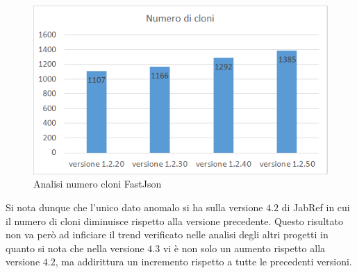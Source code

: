 \begin{figure}[h]
	\centering
	\includegraphics[scale=0.75, trim = 0cm 0cm 0cm 0cm, clip=true]{Grafici_fastJson/NumeroCloni.png}
	\caption{Analisi numero cloni FastJson}
	\label{fig:nCloniFastjson}
\end{figure}
Si nota dunque che l'unico dato anomalo si ha sulla versione $4.2$ di JabRef in cui il numero di cloni diminuisce rispetto alla versione precedente. Questo risultato non va però ad inficiare il trend verificato nelle analisi degli altri progetti in quanto si nota che nella versione $4.3$ vi è non solo un aumento rispetto alla versione $4.2$, ma addirittura un incremento rispetto a tutte le precedenti versioni. 

